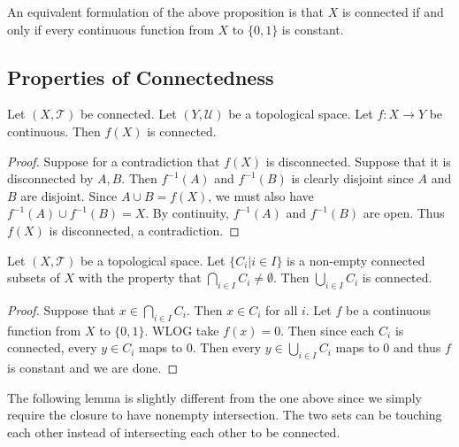 An equivalent formulation of the above proposition is that $X$ is connected if and only if every continuous function from $X$ to $\{0,1\}$ is constant. 

\subsection{Properties of Connectedness}
\begin{prp}{}{} Let $(X,\mathcal{T})$ be connected. Let $(Y,\mathcal{U})$ be a topological space. Let $f:X\to Y$ be continuous. Then $f(X)$ is connected. \tcbline
\begin{proof}
Suppose for a contradiction that $f(X)$ is disconnected. Suppose that it is disconnected by $A,B$. Then $f^{-1}(A)$ and $f^{-1}(B)$ is clearly disjoint since $A$ and $B$ are disjoint. Since $A\cup B=f(X)$, we must also have $f^{-1}(A)\cup f^{-1}(B)=X$. By continuity, $f^{-1}(A)$ and $f^{-1}(B)$ are open. Thus $f(X)$ is disconnected, a contradiction. 
\end{proof}
\end{prp}

\begin{prp}{}{} Let $(X,\mathcal{T})$ be a topological space. Let $\{C_i|i\in I\}$ is a non-empty connected subsets of $X$ with the property that $\bigcap_{i\in I}C_i\neq\emptyset$. Then $\bigcup_{i\in I}C_i$ is connected. \tcbline
\begin{proof}
Suppose that $x\in\bigcap_{i\in I}C_i$. Then $x\in C_i$ for all $i$. Let $f$ be a continuous function from $X$ to $\{0,1\}$. WLOG take $f(x)=0$. Then since each $C_i$ is connected, every $y\in C_i$ maps to $0$. Then every $y\in\bigcup_{i\in I}C_i$ maps to $0$ and thus $f$ is constant and we are done. 
\end{proof}
\end{prp}

The following lemma is slightly different from the one above since we simply require the closure to have nonempty intersection. The two sets can be touching each other instead of intersecting each other to be connected. 

